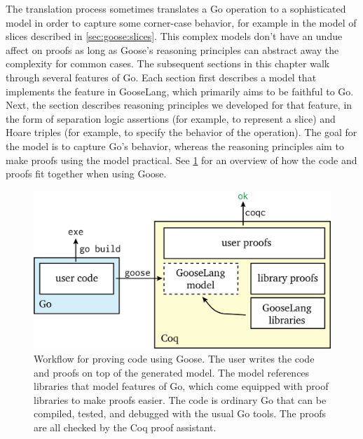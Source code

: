 The translation process sometimes translates a Go operation to a sophisticated
model in order to capture some corner-case behavior, for example in the model of
slices described in \cref{sec:goose:slices}. This complex models don't have an
undue affect on proofs as long as Goose's reasoning principles can abstract away
the complexity for common cases. The subsequent sections in this chapter
walk through several features of Go. Each section first describes a model that
implements the feature in GooseLang, which primarily aims to
be faithful to Go. Next, the section describes reasoning principles we developed for that
feature, in the form of separation logic assertions (for example, to
represent a slice) and Hoare triples (for example, to specify the
behavior of the  operation). The goal for the model is to capture
Go's behavior, whereas the reasoning
principles aim to make proofs using the model practical. See
\cref{fig:goose:workflow} for an overview of how
the code and proofs fit together when using Goose.

\begin{figure}
  \includegraphics{fig/goose-proofs.png}
  \vspace{0.5\baselineskip}
  \caption{Workflow for proving code using Goose. The user writes the code and
    proofs on top of the generated model. The model references libraries that
    model features of Go, which come equipped with proof libraries to make
    proofs easier. The code is ordinary Go that can be compiled, tested, and
    debugged with the usual Go tools. The proofs are all checked by the Coq
    proof assistant.}
  \label{fig:goose:workflow}
\end{figure}
